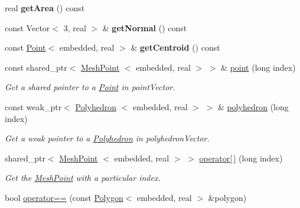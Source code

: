 \begin{DoxyCompactItemize}
\item 
\hypertarget{class_polygon_a12cd12e47dd6b7d7ea0fd7fb10db4eed}{real {\bfseries get\-Area} () const }\label{class_polygon_a12cd12e47dd6b7d7ea0fd7fb10db4eed}

\item 
\hypertarget{class_polygon_a3c6b41daa52625ae8fc00517b4876032}{const \-Vector$<$ 3, real $>$ \& {\bfseries get\-Normal} () const }\label{class_polygon_a3c6b41daa52625ae8fc00517b4876032}

\item 
\hypertarget{class_polygon_a8e4e62c641a9b6bee472d0e066680e08}{const \hyperlink{class_point}{\-Point}$<$ embedded, real $>$ \& {\bfseries get\-Centroid} () const }\label{class_polygon_a8e4e62c641a9b6bee472d0e066680e08}

\item 
\hypertarget{class_polygon_a56f83109c9c8ad214f41bd8036efb32c}{const shared\-\_\-ptr$<$ \hyperlink{class_mesh_point}{\-Mesh\-Point}\*
$<$ embedded, real $>$ $>$ \& \hyperlink{class_polygon_a56f83109c9c8ad214f41bd8036efb32c}{point} (long index)}\label{class_polygon_a56f83109c9c8ad214f41bd8036efb32c}

\begin{DoxyCompactList}\small\item\em \-Get a shared pointer to a \hyperlink{class_point}{\-Point} in point\-Vector. \end{DoxyCompactList}\item 
\hypertarget{class_polygon_a57bfc8000b2c43678fcc5841252f744d}{const weak\-\_\-ptr$<$ \hyperlink{class_polyhedron}{\-Polyhedron}\*
$<$ embedded, real $>$ $>$ \& \hyperlink{class_polygon_a57bfc8000b2c43678fcc5841252f744d}{polyhedron} (long index)}\label{class_polygon_a57bfc8000b2c43678fcc5841252f744d}

\begin{DoxyCompactList}\small\item\em \-Get a weak pointer to a \hyperlink{class_polyhedron}{\-Polyhedron} in polyhedron\-Vector. \end{DoxyCompactList}\item 
\hypertarget{class_polygon_aeca77478436766b314a6dee946f28ad4}{shared\-\_\-ptr$<$ \hyperlink{class_mesh_point}{\-Mesh\-Point}\*
$<$ embedded, real $>$ $>$ \hyperlink{class_polygon_aeca77478436766b314a6dee946f28ad4}{operator\mbox{[}$\,$\mbox{]}} (long index)}\label{class_polygon_aeca77478436766b314a6dee946f28ad4}

\begin{DoxyCompactList}\small\item\em \-Get the \hyperlink{class_mesh_point}{\-Mesh\-Point} with a particular index. \end{DoxyCompactList}\item 
\hypertarget{class_polygon_aba500dd40a805acea4bf7c050b6ba95a}{bool \hyperlink{class_polygon_aba500dd40a805acea4bf7c050b6ba95a}{operator==} (const \hyperlink{class_polygon}{\-Polygon}$<$ embedded, real $>$ \&polygon)}\label{class_polygon_aba500dd40a805acea4bf7c050b6ba95a}


\end{DoxyCompactItemize}
